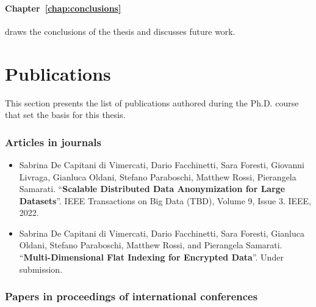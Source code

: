 \paragraph*{Chapter~\ref{chap:conclusions}} draws the conclusions of
the thesis and discusses future work.

\section{Publications}

This section presents the list of publications authored during the
Ph.D. course that set the basis for this thesis.

\subsubsection*{Articles in journals}

\begin{itemize}
    \nocite{scalable-mondrian}
    \item Sabrina De Capitani di Vimercati, Dario Facchinetti, Sara
        Foresti, Giovanni Livraga, Gianluca Oldani, Stefano
        Paraboschi, Matthew Rossi, Pierangela Samarati.
        ``\textbf{Scalable Distributed Data Anonymization for Large
        Datasets}''. IEEE Transactions on Big Data (TBD), Volume 9,
        Issue 3. IEEE, 2022.
    
    \nocite{k-flat}
    \item Sabrina De Capitani di Vimercati, Dario Facchinetti, Sara
        Foresti, Gianluca Oldani, Stefano Paraboschi, Matthew Rossi,
        and Pierangela Samarati. ``\textbf{Multi-Dimensional Flat
        Indexing for Encrypted Data}''. Under submission.
\end{itemize}

\subsubsection*{Papers in proceedings of international conferences}

